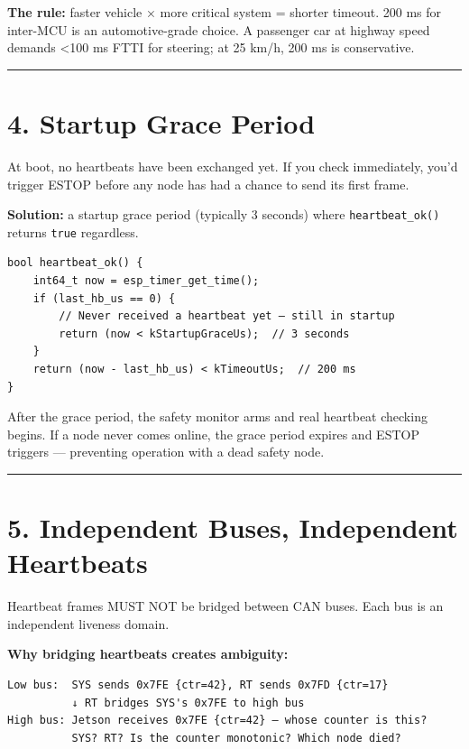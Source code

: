 \documentclass[12pt,a4paper,oneside]{report}
\begin{document}
\textbf{The rule:} faster vehicle × more critical system = shorter timeout. 200
ms for inter-MCU is an automotive-grade choice. A passenger car at highway speed
demands \textless100 ms FTTI for steering; at 25 km/h, 200 ms is conservative.

\begin{center}\rule{0.5\linewidth}{0.5pt}\end{center}

\section{4. Startup Grace Period}\label{startup-grace-period}

At boot, no heartbeats have been exchanged yet. If you check immediately, you'd
trigger ESTOP before any node has had a chance to send its first frame.

\textbf{Solution:} a startup grace period (typically 3 seconds) where
\texttt{heartbeat\_ok()} returns \texttt{true} regardless.

\begin{verbatim}
bool heartbeat_ok() {
    int64_t now = esp_timer_get_time();
    if (last_hb_us == 0) {
        // Never received a heartbeat yet — still in startup
        return (now < kStartupGraceUs);  // 3 seconds
    }
    return (now - last_hb_us) < kTimeoutUs;  // 200 ms
}
\end{verbatim}

After the grace period, the safety monitor arms and real heartbeat checking
begins. If a node never comes online, the grace period expires and ESTOP
triggers --- preventing operation with a dead safety node.

\begin{center}\rule{0.5\linewidth}{0.5pt}\end{center}

\section{5. Independent Buses, Independent
Heartbeats}\label{independent-buses-independent-heartbeats}

Heartbeat frames MUST NOT be bridged between CAN buses. Each bus is an
independent liveness domain.

\textbf{Why bridging heartbeats creates ambiguity:}

\begin{verbatim}
Low bus:  SYS sends 0x7FE {ctr=42}, RT sends 0x7FD {ctr=17}
          ↓ RT bridges SYS's 0x7FE to high bus
High bus: Jetson receives 0x7FE {ctr=42} — whose counter is this?
          SYS? RT? Is the counter monotonic? Which node died?
\end{verbatim}
\end{document}
